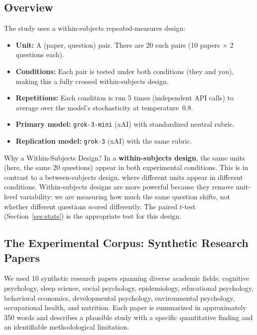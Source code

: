\documentclass[12pt, letterpaper]{article}
\begin{document}
\subsection{Overview}

The study uses a within-subjects repeated-measures design:

\begin{itemize}[noitemsep]
  \item \textbf{Unit:} A (paper, question) pair. There are 20 such pairs
        (10 papers $\times$ 2 questions each).
  \item \textbf{Conditions:} Each pair is tested under both conditions
        (they and you), making this a fully crossed within-subjects design.
  \item \textbf{Repetitions:} Each condition is run 5 times (independent API calls)
        to average over the model's stochasticity at temperature~0.8.
  \item \textbf{Primary model:} \texttt{grok-3-mini} (xAI) with standardized
        neutral rubric.
  \item \textbf{Replication model:} \texttt{grok-3} (xAI) with the same rubric.
\end{itemize}

\begin{keyconcept}{Why a Within-Subjects Design?}
  In a \textbf{within-subjects design}, the same units (here, the same 20 questions)
  appear in both experimental conditions. This is in contrast to a between-subjects
  design, where different units appear in different conditions. Within-subjects designs
  are more powerful because they remove unit-level variability: we are measuring how
  much the same question shifts, not whether different questions scored differently.
  The paired $t$-test (Section~\ref{sec:stats}) is the appropriate test for this design.
\end{keyconcept}

\subsection{The Experimental Corpus: Synthetic Research Papers}

We used 10 synthetic research papers spanning diverse academic fields: cognitive
psychology, sleep science, social psychology, epidemiology, educational psychology,
behavioral economics, developmental psychology, environmental psychology, occupational
health, and nutrition. Each paper is summarized in approximately 350 words and describes
a plausible study with a specific quantitative finding and an identifiable methodological
limitation.
\end{document}
